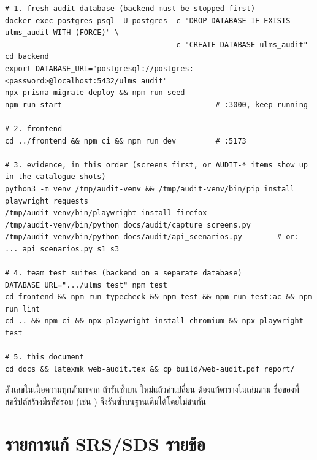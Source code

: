 \begin{lstlisting}[language={}]
# 1. fresh audit database (backend must be stopped first)
docker exec postgres psql -U postgres -c "DROP DATABASE IF EXISTS ulms_audit WITH (FORCE)" \
                                      -c "CREATE DATABASE ulms_audit"
cd backend
export DATABASE_URL="postgresql://postgres:<password>@localhost:5432/ulms_audit"
npx prisma migrate deploy && npm run seed
npm run start                                   # :3000, keep running

# 2. frontend
cd ../frontend && npm ci && npm run dev         # :5173

# 3. evidence, in this order (screens first, or AUDIT-* items show up in the catalogue shots)
python3 -m venv /tmp/audit-venv && /tmp/audit-venv/bin/pip install playwright requests
/tmp/audit-venv/bin/playwright install firefox
/tmp/audit-venv/bin/python docs/audit/capture_screens.py
/tmp/audit-venv/bin/python docs/audit/api_scenarios.py        # or: ... api_scenarios.py s1 s3

# 4. team test suites (backend on a separate database)
DATABASE_URL=".../ulms_test" npm test
cd frontend && npm run typecheck && npm test && npm run test:ac && npm run lint
cd .. && npm ci && npx playwright install chromium && npx playwright test

# 5. this document
cd docs && latexmk web-audit.tex && cp build/web-audit.pdf report/
\end{lstlisting}

ตัวเลขในเนื้อความทุกตัวมาจาก  ถ้ารันซ้ำบน  ใหม่แล้วค่าเปลี่ยน ต้องแก้ตารางในเล่มตาม
ชื่อของที่สคริปต์สร้างมีรหัสรอบ (เช่น \code{AUDIT-S1 ... 09151258}) จึงรันซ้ำบนฐานเดิมได้โดยไม่ชนกัน

\section{รายการแก้ SRS/SDS รายข้อ}
\label{app:srs}

